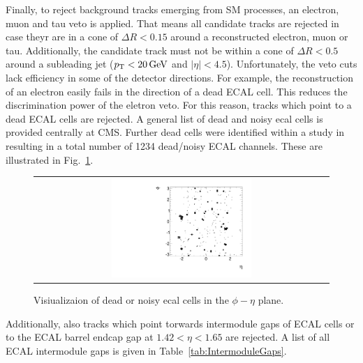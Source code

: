 Finally, to reject background tracks emerging from SM processes, an electron, muon and tau veto is applied.
That means all candidate tracks are rejected in case theyr are in a cone of $\Delta R<0.15$ around a reconstructed electron, muon or tau.
Additionally, the candidate track must not be within a cone of $\Delta R<0.5$ around a subleading jet ($p_{\text{T}}<20\,\text{Ge}\kern-0.06667em\text{V}$ and $|\eta|<4.5$).
Unfortunately, the veto cuts lack efficiency in some of the detector directions.
For example, the reconstruction of an electron easily fails in the direction of a dead ECAL cell.
This reduces the discrimination power of the eletron veto.
For this reason, tracks which point to a dead ECAL cells are rejected.
A general list of dead and noisy ecal cells is provided centrally at CMS.
Further dead cells were identified within a study in \cite{bib:CMS:DT_8TeV} resulting in a total number of 1234 dead/noisy ECAL channels. 
These are illustrated in Fig.~\ref{fig:DeadECALmap}.
\begin{figure}[!t]
  \centering 
  \begin{tabular}{c}
    \includegraphics[width=0.49\textwidth]{figures/analysis/DeadECALMap.pdf}
  \end{tabular}
  \caption{Visiualizaion of dead or noisy ecal cells in the $\phi - \eta$ plane.}
  \label{fig:DeadECALmap}
\end{figure}
Additionally, also tracks which point torwards intermodule gaps of ECAL cells or to the ECAL barrel endcap gap at $1.42<\eta<1.65$ are rejected.
A list of all ECAL intermodule gaps is given in Table~\ref{tab:IntermoduleGaps}.
\renewcommand{\arraystretch}{1.5}
\begin{table}[!hbt]
\centering
\caption{Intermodule ECAL gaps.}
\label{tab:IntermoduleGaps}
\end{table}  

